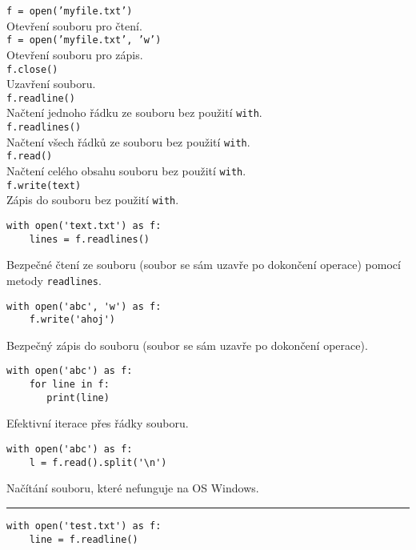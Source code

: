 \documentclass[12pt,a4paper]{article}
\begin{document}
\pagestyle{empty}

\setlength\parindent{0pt}
\setlength{\columnsep}{60pt}
\begin{multicols}{2}

\Large

\texttt{f = open('myfile.txt')}\\

Otevření souboru pro čtení.\\

\texttt{f = open('myfile.txt', 'w')}\\

Otevření souboru pro zápis.\\

\texttt{f.close()}\\

Uzavření souboru.\\

\texttt{f.readline()}\\

Načtení jednoho řádku ze souboru bez použití \texttt{with}.\\

\texttt{f.readlines()}\\

Načtení všech řádků ze souboru bez použití \texttt{with}.\\

\texttt{f.read()}\\

Načtení celého obsahu souboru bez použití \texttt{with}.\\

\texttt{f.write(text)}\\

Zápis do souboru bez použití \texttt{with}.

\begin{verbatim}
with open('text.txt') as f:
    lines = f.readlines()
\end{verbatim}

Bezpečné čtení ze souboru (soubor se sám uzavře po dokončení operace) pomocí
metody \texttt{readlines}.

\begin{verbatim}
with open('abc', 'w') as f:
    f.write('ahoj')
\end{verbatim}

Bezpečný zápis do souboru (soubor se sám uzavře po dokončení operace).\\

\begin{verbatim}
with open('abc') as f:
    for line in f:
       print(line)
\end{verbatim}

Efektivní iterace přes řádky souboru.

\begin{verbatim}
with open('abc') as f:
    l = f.read().split('\n')
\end{verbatim}

Načítání souboru, které nefunguje na OS Windows.

\rule{\linewidth}{1pt}

\begin{verbatim}
with open('test.txt') as f:
    line = f.readline()
\end{verbatim}

\end{multicols}
\end{document}
